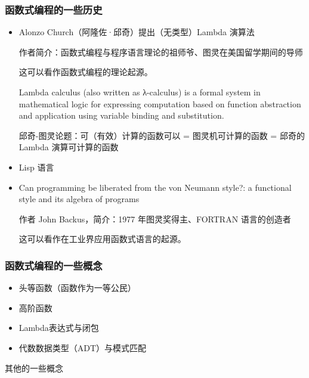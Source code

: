 \documentclass{beamer}
\begin{document}
\begin{frame}
    \frametitle{函数式编程的一些历史}
    \begin{itemize}
        \item Alonzo Church（阿隆佐·邱奇）提出（无类型）Lambda 演算法\cite{lambda_calculus_wikipedia}

              作者简介：函数式编程与程序语言理论的祖师爷、图灵在美国留学期间的导师

              这可以看作函数式编程的理论起源。

              Lambda calculus (also written as λ-calculus) is a formal system in mathematical logic for expressing computation based on function abstraction and application using variable binding and substitution.

              邱奇-图灵论题：可（有效）计算的函数可以 = 图灵机可计算的函数 = 邱奇的 Lambda 演算可计算的函数

        \item Lisp 语言

        \item Can programming be liberated from the von Neumann style?: a functional style and its algebra of programs

              作者 John Backus，简介：1977 年图灵奖得主、FORTRAN 语言的创造者

              这可以看作在工业界应用函数式语言的起源。
    \end{itemize}
\end{frame}

\begin{frame}
    \frametitle{函数式编程的一些概念}
    \begin{itemize}
        \item 头等函数（函数作为一等公民）
        \item 高阶函数
        \item Lambda表达式与闭包
        \item 代数数据类型（ADT）与模式匹配
    \end{itemize}
\end{frame}

\begin{frame}{其他的一些概念}


\end{frame}
\end{document}
